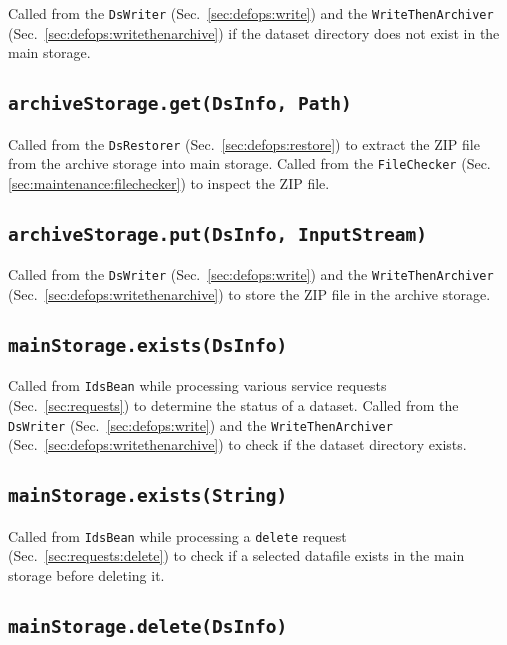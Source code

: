 \documentclass[paper=a4]{scrartcl}
\begin{document}
Called from the \texttt{DsWriter} (Sec.\ \ref{sec:defops:write}) and
the \texttt{WriteThenArchiver}
(Sec.\ \ref{sec:defops:writethenarchive}) if the dataset directory
does not exist in the main storage.

\subsection{\texttt{archiveStorage.get(DsInfo, Path)}}

Called from the \texttt{DsRestorer} (Sec.\ \ref{sec:defops:restore})
to extract the ZIP file from the archive storage into main storage.
Called from the \texttt{FileChecker}
(Sec. \ref{sec:maintenance:filechecker}) to inspect the ZIP file.

\subsection{\texttt{archiveStorage.put(DsInfo, InputStream)}}

Called from the \texttt{DsWriter} (Sec.\ \ref{sec:defops:write}) and
the \texttt{WriteThenArchiver}
(Sec.\ \ref{sec:defops:writethenarchive}) to store the ZIP file in the
archive storage.

\subsection{\texttt{mainStorage.exists(DsInfo)}}

Called from \texttt{IdsBean} while processing various service requests
(Sec.\ \ref{sec:requests}) to determine the status of a dataset.
Called from the \texttt{DsWriter} (Sec.\ \ref{sec:defops:write}) and
the \texttt{WriteThenArchiver}
(Sec.\ \ref{sec:defops:writethenarchive}) to check if the dataset
directory exists.

\subsection{\texttt{mainStorage.exists(String)}}

Called from \texttt{IdsBean} while processing a \texttt{delete}
request (Sec.\ \ref{sec:requests:delete}) to check if a selected
datafile exists in the main storage before deleting it.

\subsection{\texttt{mainStorage.delete(DsInfo)}}
\end{document}

